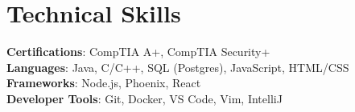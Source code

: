 \documentclass[letterpaper,11pt]{article}
\begin{document}
%
\section{Technical Skills}
 \begin{itemize}[leftmargin=0.15in, label={}]
    \small{\item{
     \textbf{Certifications}{: CompTIA A+, CompTIA Security+} \\
     \textbf{Languages}{: Java, C/C++, SQL (Postgres), JavaScript, HTML/CSS} \\
     \textbf{Frameworks}{: Node.js, Phoenix, React} \\
     \textbf{Developer Tools}{: Git, Docker, VS Code, Vim, IntelliJ}
    }}
 \end{itemize}


\end{document}
